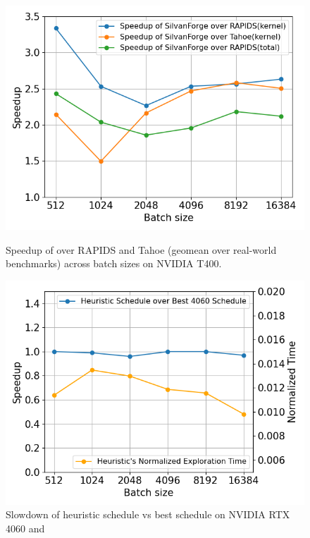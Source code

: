 \begin{figure}[htb]
\begin{minipage}[t]{.3\linewidth}
  \centering
  \includegraphics[width=\linewidth]{figures/geomean_speedup_T400_kernel_time.png}
  \caption{Speedup of \Treebeard{} over RAPIDS and Tahoe (geomean over real-world 
  benchmarks) across batch sizes on NVIDIA T400.}
  \label{Fig:TBvsRAPIDSTahoe_T400_Speedup}
\end{minipage}
\hspace{0.5cm}
\begin{minipage}[t]{.3\linewidth}
  \centering
  \includegraphics[width=\linewidth]{figures/speedup_vs_norm_time_line_graph_4060.png}
  \caption{Slowdown of heuristic schedule vs best schedule on NVIDIA RTX 4060 and 
}
\end{minipage}
\end{figure}
